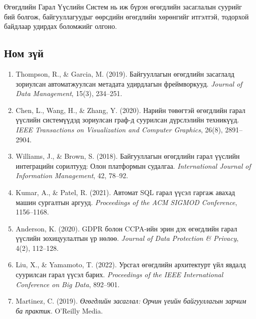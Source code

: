 Өгөгдлийн Гарал Үүслийн Систем нь иж бүрэн өгөгдлийн засаглалын суурийг бий болгож, байгууллагуудыг өөрсдийн өгөгдлийн хөрөнгийг итгэлтэй, тодорхой байдлаар удирдах боломжийг олгоно.

\subsection{Ном зүй}
\label{subsec:dl_references}

\begin{enumerate}
    \item Thompson, R., \& Garcia, M. (2019). Байгууллагын өгөгдлийн засаглалд зориулсан автоматжуулсан метадата удирдлагын фреймворкууд. \textit{Journal of Data Management}, 15(3), 234--251.
    
    \item Chen, L., Wang, H., \& Zhang, Y. (2020). Нарийн төвөгтэй өгөгдлийн гарал үүслийн системүүдэд зориулсан граф-д суурилсан дүрслэлийн техникүүд. \textit{IEEE Transactions on Visualization and Computer Graphics}, 26(8), 2891--2904.
    
    \item Williams, J., \& Brown, S. (2018). Байгууллагын өгөгдлийн гарал үүслийн интеграцийн сорилтууд: Олон платформын судалгаа. \textit{International Journal of Information Management}, 42, 78--92.
    
    \item Kumar, A., \& Patel, R. (2021). Автомат SQL гарал үүсэл гаргаж авахад машин сургалтын аргууд. \textit{Proceedings of the ACM SIGMOD Conference}, 1156--1168.
    
    \item Anderson, K. (2020). GDPR болон CCPA-ийн эрин дэх өгөгдлийн гарал үүслийн зохицуулалтын үр нөлөө. \textit{Journal of Data Protection \& Privacy}, 4(2), 112--128.
    
    \item Liu, X., \& Yamamoto, T. (2022). Урсгал өгөгдлийн архитектурт үйл явдалд суурилсан гарал үүсэл барих. \textit{Proceedings of the IEEE International Conference on Big Data}, 892--901.
    
    \item Martinez, C. (2019). \textit{Өгөгдлийн засаглал: Орчин үеийн байгууллагын зарчим ба практик}. O'Reilly Media.
\end{enumerate}

\vfill
